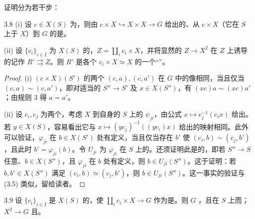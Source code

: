 证明分为若干步：
\begin{SGAresult}{}{3.8}
(i) 设 $c\in X(S)$ 为，则由 $c\times X\hookrightarrow X\times X\to G$ 给出的、从 $c\times X$（它在 $S$ 上于 $X$）到 $G$ 的是。

(ii) 设 $\{c_i\}_{i\in I}$ 为 $X(S)$ 的，$Z=\coprod_i c_i\times X$，并将显然的 $Z\to X^2$ 在 $Z$ 上诱导的记作 $R'\rightrightarrows Z$。则 $R'$ 是各个 $c_i\times X\simeq X$ 的一个“”。
\end{SGAresult}
\begin{proof}
(i) $(c\times X)(S')$ 的两个 $(c,a),(c,a')$ 在 $G$ 中的像相同，当且仅当 $(c,a)\sim(c,a')$，即对适当的 $S''\to S'$ 及 $x\in X(S'')$，有 $(xc)a\sim(xc)a'$；由规则 3 得 $a=a'$。

(ii) 设 $c_i,c_j$ 为两个，考虑 $X$ 到自身的 $S$ 上的 $\psi_{ji}$，由公式 $x\mapsto c_j^{-1}(c_i x)$ 给出。若 $y\in X(S)$，容易看出它与 $x\mapsto(yc_j)^{-1}((yc_i)x)$ 给出的映射相同。此外可以验证，$\varphi_{ji}$ 在 $b\in X(S')$ 处有定义，当且仅当存在 $b'$ 使 $(c_i,b)\sim(c_j,b')$，且此时 $b'=\varphi_{ji}(b)$。令 $U_{ji}$ 为 $\varphi_{ji}$ 在 $S$ 上的。还须证明此是的，即若 $S''\to S$ 任意、$b\in X(S'')$，且 $\varphi_{ji}$ 在 $b$ 处有定义，则 $b\in U_{ji}(S'')$。这于证明：若 $b,b'\in X(S'')$ 满足 $(c_i,b)\simeq(c_j,b')$，则 $b\in U_{ji}(S'')$。这一事实的验证与 (3.5) 类似，留给读者。
\end{proof}
\begin{SGAresult}{}{3.9}
设 $\{c_i\}_{i\in I}$ 是 $X(S)$ 的，使 $\coprod_i c_i\times X\to G$ 作为是。则 $G$ ，且在 $S$ 上而； $X^2\to G$ 且。
\end{SGAresult}
